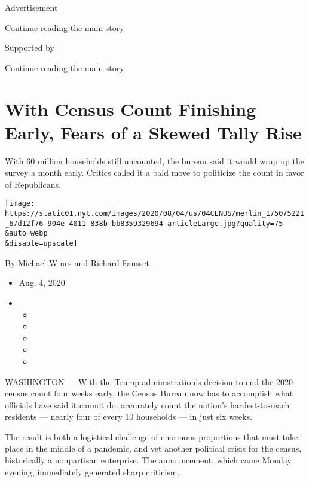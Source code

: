 Advertisement

\protect\hyperlink{after-top}{Continue reading the main story}

Supported by

\protect\hyperlink{after-sponsor}{Continue reading the main story}

\hypertarget{with-census-count-finishing-early-fears-of-a-skewed-tally-rise}{%
\section{With Census Count Finishing Early, Fears of a Skewed Tally
Rise}\label{with-census-count-finishing-early-fears-of-a-skewed-tally-rise}}

With 60 million households still uncounted, the bureau said it would
wrap up the survey a month early. Critics called it a bald move to
politicize the count in favor of Republicans.

\texttt{[image: https://static01.nyt.com/images/2020/08/04/us/04CENUS/merlin\_175075221\_67d12f76-904e-4011-838b-bb8359329694-articleLarge.jpg?quality=75\\\&auto=webp\\\&disable=upscale]}

By \href{https://www.nytimes.com/by/michael-wines}{Michael Wines} and
\href{https://www.nytimes.com/by/richard-fausset}{Richard Fausset}

\begin{itemize}
\item
  Aug. 4, 2020
\item
  \begin{itemize}
  \item
  \item
  \item
  \item
  \item
  \end{itemize}
\end{itemize}

WASHINGTON --- With the Trump administration's decision to end the 2020
census count four weeks early, the Census Bureau now has to accomplish
what officials have said it cannot do: accurately count the nation's
hardest-to-reach residents --- nearly four of every 10 households --- in
just six weeks.

The result is both a logistical challenge of enormous proportions that
must take place in the middle of a pandemic, and yet another political
crisis for the census, historically a nonpartisan enterprise. The
announcement, which came Monday evening, immediately generated sharp
criticism.

